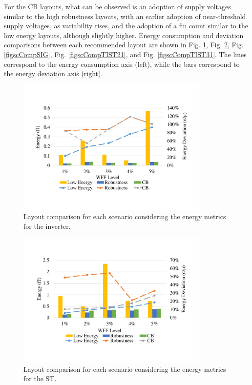 \documentclass[pgmicro,diss,english]{iiufrgs}
\begin{document}
For the CB layouts, what can be observed is an adoption of supply voltages similar to the high robustness layouts, with an earlier adoption of near-threshold supply voltages, as variability rises, and the adoption of a fin count similar to the low energy layouts, although slightly higher. Energy consumption and deviation comparisons between each recommended layout are shown in Fig. \ref{figscCompINV}, Fig. \ref{figscCompST}, Fig. \ref{figscCompSIG}, Fig. \ref{figscCompTIST21}, and Fig. \ref{figscCompTIST31}. The lines correspond to the energy consumption axis (left), while the bars correspond to the energy deviation axis (right).

    \begin{figure}[H]
        \centering
        	\caption{Layout comparison for each scenario considering the energy metrics for the inverter.\label{figscCompINV}}
        	\includegraphics[width=0.85\textwidth, trim={1.25cm 2cm 2cm 3cm}, clip]{comp3Linv2Energy.pdf}
   \end{figure}

\begin{figure}[t]
     \centering
            \includegraphics[width=0.85\textwidth, trim={1.25cm 3cm 2cm 3cm}, clip]{comp3Lst2Energy.pdf}
            \caption{Layout comparison for each scenario considering the energy metrics for the ST.\label{figscCompST}}
    \end{figure}
\end{document}
